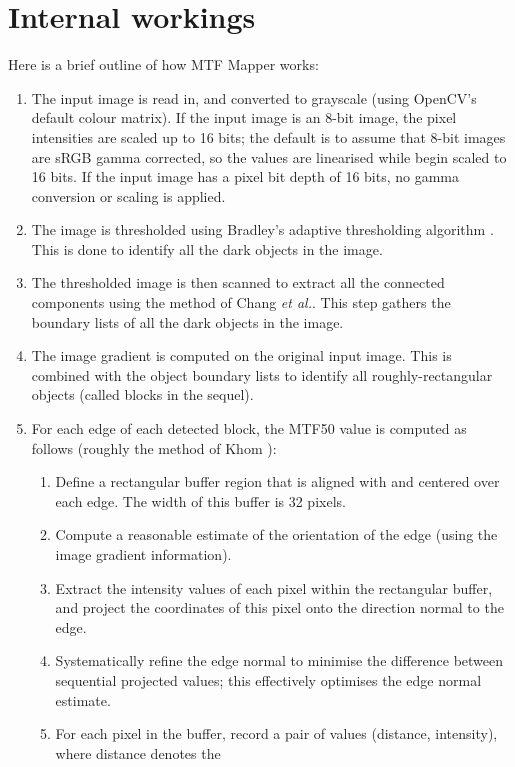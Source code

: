 \documentclass[a4paper]{article}
\begin{document}
\section{Internal workings}
\label{sec:description}
Here is a brief outline of how MTF Mapper works:
\begin{enumerate}
    \item The input image is read in, and converted to grayscale (using
OpenCV's default colour matrix). If the input image is an 8-bit image, the
pixel intensities are scaled up to 16 bits; the default is to assume that
8-bit images are sRGB gamma corrected, so the values are linearised while
begin scaled to 16 bits. If the input image has a pixel bit depth of 16
bits, no gamma conversion or scaling is applied.
    \item The image is thresholded using Bradley's adaptive thresholding 
algorithm \cite{bradley}. This is done to identify all the dark objects in
the image.
    \item The thresholded image is then scanned to extract all the connected
components using the method of Chang \textit{et al.}\cite{chang}. This step
gathers the boundary lists of all the dark objects in the image.
    \item The image gradient is computed on the original input image. This
is combined with the object boundary lists to identify all
roughly-rectangular objects (called blocks in the sequel).
    \item For each edge of each detected block, the MTF50 value is computed
as follows (roughly the method of Khom \cite{khom}):
	\begin{enumerate}
	  \item Define a rectangular buffer region that is aligned with and
centered over each edge. The width of this buffer is 32 pixels.
	  \item Compute a reasonable estimate of the orientation of the edge
(using the image gradient information).
	  \item Extract the intensity values of each pixel within the
rectangular buffer, and project the coordinates of this pixel onto the
direction normal to the edge.
          \item Systematically refine the edge normal to minimise the
difference between sequential projected values; this effectively optimises
the edge normal estimate.
	  \item For each pixel in the buffer, record a pair of values
(\textsf{distance}, \textsf{intensity}), where \textsf{distance} denotes the

\end{enumerate}
\end{enumerate}
\end{document}

